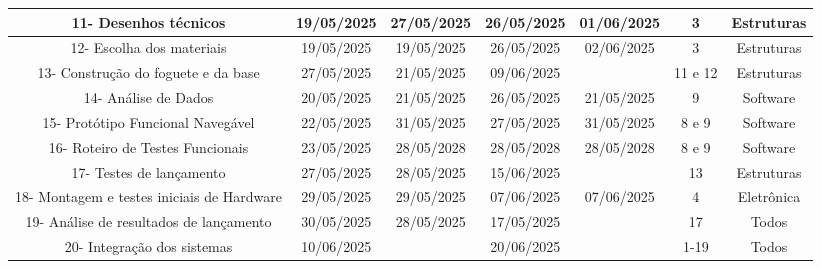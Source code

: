 \begin{landscape}
\begin{table}[htpb]
\begin{center}
\begin{tabular}{|c|c|c|c|c|c|c|}
11- Desenhos técnicos & 19/05/2025 & 27/05/2025 & 26/05/2025 & 01/06/2025 & 3 & Estruturas            
\\ \hline

12- Escolha dos materiais & 19/05/2025 & 19/05/2025 & 26/05/2025 & 02/06/2025 & 3 & Estruturas            
\\ \hline

13- Construção do foguete e da base & 27/05/2025 & 21/05/2025 & 09/06/2025 &  & 11 e 12 & Estruturas         \\ \hline

14- Análise de Dados & 20/05/2025 & 21/05/2025 & 26/05/2025 & 21/05/2025 & 9 & Software              
\\ \hline

15- Protótipo Funcional Navegável & 22/05/2025 & 31/05/2025 & 27/05/2025 & 31/05/2025 & 8 e 9 & Software   \\ \hline

16- Roteiro de Testes Funcionais & 23/05/2025 & 28/05/2028 & 28/05/2028 & 28/05/2028 & 8 e 9 & Software
\\ \hline

17- Testes de lançamento & 27/05/2025 & 28/05/2025 & 15/06/2025 &  & 13 & Estruturas            
\\ \hline

18- Montagem e testes iniciais de Hardware & 29/05/2025 & 29/05/2025 & 07/06/2025 & 07/06/2025 & 4 & Eletrônica 
\\ \hline

19- Análise de resultados de lançamento & 30/05/2025 & 28/05/2025 & 17/05/2025 &   & 17 & Todos                 \\ \hline
20- Integração dos sistemas & 10/06/2025 &  & 20/06/2025 &  & 1-19 & Todos
\\ \hline              

\end{tabular}
\end{center}
\end{table}







\end{landscape}
